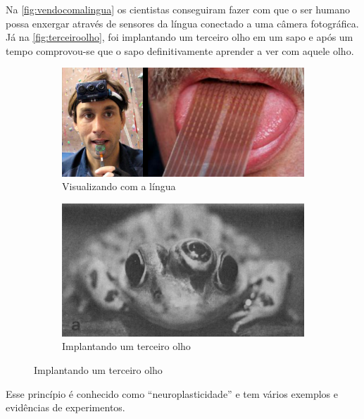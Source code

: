Na \autoref{fig:vendocomalingua} os cientistas conseguiram fazer com que o ser humano possa enxergar através de sensores da língua conectado a uma câmera fotográfica. Já na \autoref{fig:terceiroolho}, foi implantando um terceiro olho em um sapo e após um tempo comprovou-se que o sapo definitivamente aprender a ver com aquele olho.


\begin{figure}
  \caption{Exemplos de representação de sensores no cérebro}
  \begin{subfigure}[htb]{0.5\textwidth} 
    \includegraphics[width=\textwidth]{img/seeingtongue}
    \caption{Visualizando com a língua} \label{fig:vendocomalingua}
  \end{subfigure} 
  \begin{subfigure}[htb]{0.41\textwidth}
    \includegraphics[width=\textwidth]{img/thirdeye}
    \caption{Implantando um terceiro olho} \label{fig:terceiroolho}
  \end{subfigure} 

\end{figure}

Esse princípio é conhecido como ``neuroplasticidade'' e tem vários exemplos e evidências de experimentos.

